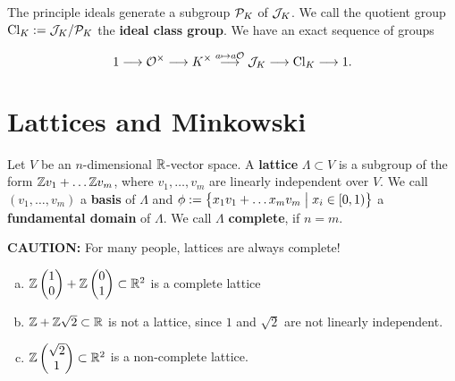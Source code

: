 \begin{defi}
	The principle ideals generate a subgroup $\mathcal{P}_K$ of $\mathcal{J}_K$. We call the quotient group $\operatorname{Cl}_K := \mathcal{J}_K / \mathcal{P}_K$ the \textbf{ideal class group}. We have an exact sequence of groups
	
	\[ 1 \longrightarrow \mathcal{O}^\times \longrightarrow K^\times \overset{a \mapsto a\mathcal{O}}{\longrightarrow} \mathcal{J}_K \longrightarrow \operatorname{Cl}_K \longrightarrow 1. \]
\end{defi}

\section{Lattices and Minkowski}

\begin{defi}
	Let $V$ be an $n$-dimensional $\mathbb{R}$-vector space.
	A \textbf{lattice} $\Lambda \subset V$ is a subgroup of the form $\mathbb{Z} v_1 + \dots \mathbb{Z} v_m$, where $v_1, \dots, v_m$ are linearly independent over $V$. We call $(v_1, \dots, v_m)$ a \textbf{basis} of $\Lambda$ and $\phi := \left\{ {x_1v_1 + \dots x_mv_m} \bigm| {x_i \in \left[ 0,1 \right )} \right\}$ a \textbf{fundamental domain} of $\Lambda$. We call $\Lambda$ \textbf{complete}, if $n = m$.
	
	\bigskip
	
	\textbf{CAUTION:} For many people, lattices are always complete!
\end{defi}

\begin{Bsp}
	\begin{enumerate}[(a)]
		\item $\mathbb{Z} \begin{pmatrix} 1 \\ 0 \end{pmatrix} + \mathbb{Z}  \begin{pmatrix} 0 \\ 1 \end{pmatrix} \subset \mathbb{R}^2$ is a complete lattice
		
		\item $\mathbb{Z} + \mathbb{Z} \sqrt{2} \subset \mathbb{R}$ is not a lattice, since $1$ and $\sqrt{2}$ are not linearly independent.
		
		\item $\mathbb{Z} \begin{pmatrix} \sqrt{2} \\ 1 \end{pmatrix} \subset \mathbb{R}^2$ is a non-complete lattice.
	\end{enumerate}
\end{Bsp}

